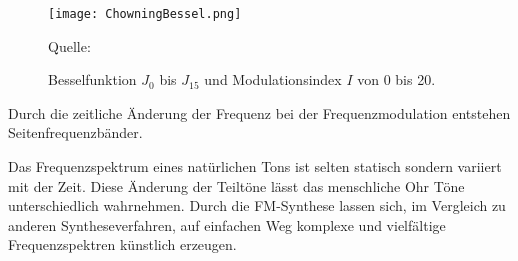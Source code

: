 \begin{figure} [ht]
\centering
  \texttt{[image: ChowningBessel.png]}
\caption{Besselfunktion $J_0$ bis $J_{15}$ und Modulationsindex $I$ von 0 bis 20. }
\label{fig:bessel3D}
Quelle: \cite{chowningPaper}
\end{figure}



Durch die zeitliche Änderung der Frequenz bei der Frequenzmodulation entstehen Seitenfrequenzbänder.


Das Frequenzspektrum eines natürlichen Tons ist selten statisch sondern variiert mit der Zeit. Diese Änderung der Teiltöne lässt das menschliche Ohr Töne unterschiedlich wahrnehmen. Durch die FM-Synthese lassen sich, im Vergleich zu anderen Syntheseverfahren, auf einfachen Weg komplexe und vielfältige Frequenzspektren künstlich erzeugen.

\FloatBarrier
